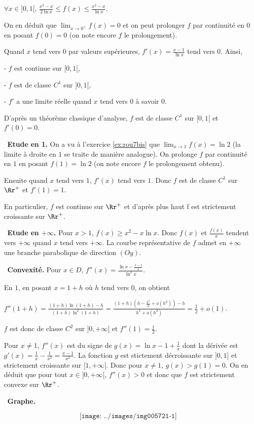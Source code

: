 {{\begin{center}
$\forall x\in]0,1[$,  $\frac{x^2-x}{2\ln x}\leqslant f(x)\leqslant\frac{x^2-x}{\ln x}$.
\end{center}

On en déduit que $\lim_{x \rightarrow 0^+}f(x) = 0$ et on peut prolonger $f$ par continuité en $0$ en posant $f(0) = 0$ (on note encore $f$ le prolongement).

Quand $x$ tend vers $0$ par valeurs supérieures, $f'(x) =\frac{x-1}{\ln x}$  tend vers 0. Ainsi,

- $f$ est continue sur $[0,1[$,

- $f$ est de classe $C^1$ sur $]0,1[$,

- $f'$ a une limite réelle quand $x$ tend vers $0$ à savoir $0$.

D'après un théorème classique d'analyse, $f$ est de classe $C^1$ sur $[0,1[$ et $f'(0) = 0$.

 \textbullet~\textbf{Etude en 1.} On a vu à l'exercice \ref{ex:rou7bis} que $\lim_{x \rightarrow 1}f(x)=\ln2$ (la limite à droite en $1$ se traite de manière analogue). On prolonge $f$ par continuité en $1$ en posant $f(1) =\ln2$ (on note encore $f$ le prolongement obtenu).
 

Ensuite quand $x$ tend vers $1$, $f'(x)$ tend vers $1$. Donc $f$ est de classe $C^1$ sur $\Rr^+$ et $f'(1)=1$.

En particulier, $f$ est continue sur $\Rr^+$ et d'après plus haut f est strictement croissante sur $\Rr^+$.

 \textbullet~\textbf{Etude en $+\infty$.} Pour  $x > 1$, $f(x)\geqslant{x^2-x}{\ln x}$. Donc $f(x)$ et $\frac{f(x)}{x}$ tendent vers $+\infty$  quand $x$ tend vers $+\infty$.
La courbe représentative de $f$ admet en $+\infty$ une branche parabolique de direction $(Oy)$.

 \textbullet~\textbf{Convexité.} Pour $x\in D$, $f''(x)=\frac{\ln x-\frac{x-1}{x}}{\ln^2x}$.
 

En $1$, en posant $x = 1+h$ où $h$ tend vers $0$, on obtient

\begin{center}
$f''(1+h)=\frac{(1+h)\ln(1+h)-h}{(1+h)\ln^2(1+h)}=\frac{(1+h)\left(h-\frac{h^2}{2}+o(h^2)\right)-h}{h^2+o(h^2)}=\frac{1}{2}+o(1)$.
\end{center}

$f$ est donc de classe $C^2$ sur $]0,+\infty[$ et $f''(1) =\frac{1}{2}$.

Pour $x\neq 1$, $f''(x)$  est du signe de $g(x)=\ln x - 1 +\frac{1}{x}$ dont la dérivée est $g'(x)=\frac{1}{x}-\frac{1}{x^2}=\frac{x-1}{x^2}$. La fonction $g$ est stictement décroissante sur $]0,1]$ et strictement croissante sur $[1,+\infty[$. Donc pour $x\neq1$, $g(x)> g(1) = 0$. On en déduit que pour tout $x\in]0,+\infty[$, $f''(x) > 0$ et donc que $f$ est strictement convexe sur $\Rr^+$.

\textbullet~\textbf{Graphe.}

$$\texttt{[image: ../images/img005721-1]}$$}
}